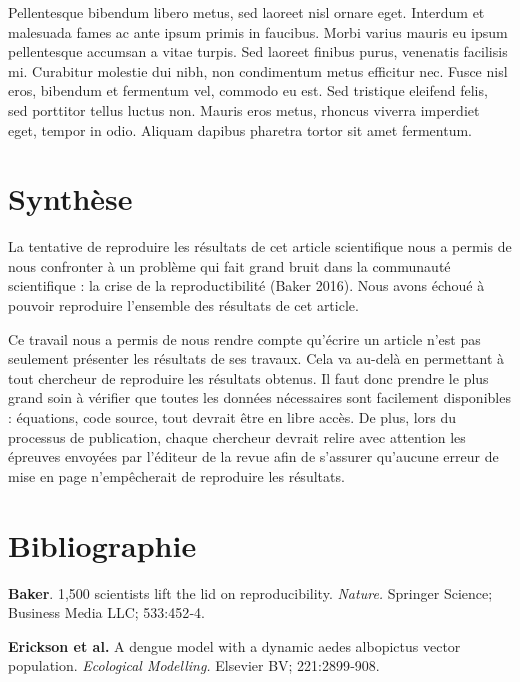 \documentclass[
  12pt,
  french,
  oneside]{article}
\begin{document}
Pellentesque bibendum libero metus, sed laoreet nisl ornare eget.
Interdum et malesuada fames ac ante ipsum primis in faucibus. Morbi
varius mauris eu ipsum pellentesque accumsan a vitae turpis. Sed laoreet
finibus purus, venenatis facilisis mi. Curabitur molestie dui nibh, non
condimentum metus efficitur nec. Fusce nisl eros, bibendum et fermentum
vel, commodo eu est. Sed tristique eleifend felis, sed porttitor tellus
luctus non. Mauris eros metus, rhoncus viverra imperdiet eget, tempor in
odio. Aliquam dapibus pharetra tortor sit amet fermentum.

\hypertarget{synthuxe8se}{%
\section{Synthèse}\label{synthuxe8se}}

La tentative de reproduire les résultats de cet article scientifique
nous a permis de nous confronter à un problème qui fait grand bruit dans
la communauté scientifique : la crise de la reproductibilité (Baker
2016). Nous avons échoué à pouvoir reproduire l'ensemble des résultats
de cet article.

Ce travail nous a permis de nous rendre compte qu'écrire un article
n'est pas seulement présenter les résultats de ses travaux. Cela va
au-delà en permettant à tout chercheur de reproduire les résultats
obtenus. Il faut donc prendre le plus grand soin à vérifier que toutes
les données nécessaires sont facilement disponibles : équations, code
source, tout devrait être en libre accès. De plus, lors du processus de
publication, chaque chercheur devrait relire avec attention les épreuves
envoyées par l'éditeur de la revue afin de s'assurer qu'aucune erreur de
mise en page n'empêcherait de reproduire les résultats.

\hypertarget{bibliographie}{%
\section*{Bibliographie}\label{bibliographie}}

\hypertarget{refs}{}
\leavevmode\hypertarget{ref-Baker_2016}{}%
\textbf{Baker}. 1,500 scientists lift the lid on reproducibility.
\emph{Nature.} Springer Science; Business Media LLC; 533:452‑4.

\leavevmode\hypertarget{ref-Erickson_2010}{}%
\textbf{Erickson et al.} A dengue model with a dynamic aedes albopictus
vector population. \emph{Ecological Modelling.} Elsevier BV;
221:2899‑908.
\end{document}
